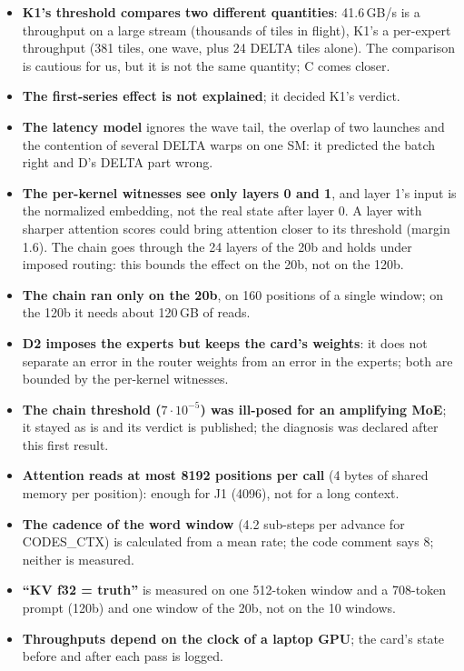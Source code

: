 \begin{faux}
\begin{itemize}
\item \textbf{K1's threshold compares two different quantities}: 41.6\,GB/s is a throughput on a large stream (thousands of tiles in flight), K1's a per-expert throughput (381 tiles, one wave, plus 24 DELTA tiles alone). The comparison is cautious for us, but it is not the same quantity; C comes closer.
\item \textbf{The first-series effect is not explained}; it decided K1's verdict.
\item \textbf{The latency model} ignores the wave tail, the overlap of two launches and the contention of several DELTA warps on one SM: it predicted the batch right and D's DELTA part wrong.
\item \textbf{The per-kernel witnesses see only layers 0 and 1}, and layer 1's input is the normalized embedding, not the real state after layer 0. A layer with sharper attention scores could bring attention closer to its threshold (margin 1.6). The chain goes through the 24 layers of the 20b and holds under imposed routing: this bounds the effect on the 20b, not on the 120b.
\item \textbf{The chain ran only on the 20b}, on 160 positions of a single window; on the 120b it needs about 120\,GB of reads.
\item \textbf{D2 imposes the experts but keeps the card's weights}: it does not separate an error in the router weights from an error in the experts; both are bounded by the per-kernel witnesses.
\item \textbf{The chain threshold ($7\cdot10^{-5}$) was ill-posed for an amplifying MoE}; it stayed as is and its verdict is published; the diagnosis was declared after this first result.
\item \textbf{Attention reads at most \num{8192} positions per call} (4 bytes of shared memory per position): enough for J1 (\num{4096}), not for a long context.
\item \textbf{The cadence of the word window} (4.2 sub-steps per advance for CODES\_CTX) is calculated from a mean rate; the code comment says 8; neither is measured.
\item \textbf{``KV f32 = truth''} is measured on one 512-token window and a 708-token prompt (120b) and one window of the 20b, not on the 10 windows.
\item \textbf{Throughputs depend on the clock of a laptop GPU}; the card's state before and after each pass is logged.
\end{itemize}
\end{faux}

